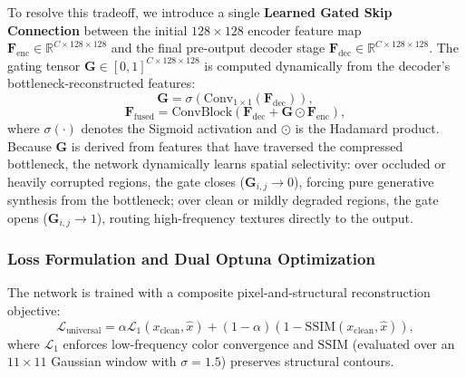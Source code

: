 \documentclass[conference]{IEEEtran}
\begin{document}
To resolve this tradeoff, we introduce a single \textbf{Learned Gated Skip Connection} between the initial $128 \times 128$ encoder feature map $\mathbf{F}_{\text{enc}} \in \mathbb{R}^{C \times 128 \times 128}$ and the final pre-output decoder stage $\mathbf{F}_{\text{dec}} \in \mathbb{R}^{C \times 128 \times 128}$. The gating tensor $\mathbf{G} \in [0, 1]^{C \times 128 \times 128}$ is computed dynamically from the decoder's bottleneck-reconstructed features:
\begin{equation}
\mathbf{G} = \sigma\left(\text{Conv}_{1\times 1}(\mathbf{F}_{\text{dec}})\right),
\end{equation}
\begin{equation}
\mathbf{F}_{\text{fused}} = \text{ConvBlock}\left(\mathbf{F}_{\text{dec}} + \mathbf{G} \odot \mathbf{F}_{\text{enc}}\right),
\end{equation}
where $\sigma(\cdot)$ denotes the Sigmoid activation and $\odot$ is the Hadamard product. Because $\mathbf{G}$ is derived from features that have traversed the compressed bottleneck, the network dynamically learns spatial selectivity: over occluded or heavily corrupted regions, the gate closes ($\mathbf{G}_{i,j} \to 0$), forcing pure generative synthesis from the bottleneck; over clean or mildly degraded regions, the gate opens ($\mathbf{G}_{i,j} \to 1$), routing high-frequency textures directly to the output.

\subsubsection{Loss Formulation and Dual Optuna Optimization}
The network is trained with a composite pixel-and-structural reconstruction objective:
\begin{equation}
\mathcal{L}_{\text{universal}} = \alpha \mathcal{L}_1(x_{\text{clean}}, \hat{x}) + (1 - \alpha)\left(1 - \text{SSIM}(x_{\text{clean}}, \hat{x})\right),
\end{equation}
where $\mathcal{L}_1$ enforces low-frequency color convergence and $\text{SSIM}$ (evaluated over an $11 \times 11$ Gaussian window with $\sigma = 1.5$) preserves structural contours.
\end{document}
